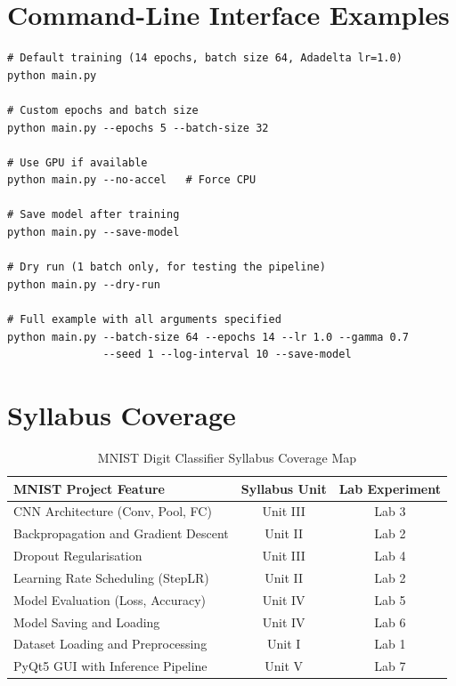 \documentclass[12pt,a4paper,openany]{report}
\begin{document}
\section{Command-Line Interface Examples}

\begin{verbatim}
# Default training (14 epochs, batch size 64, Adadelta lr=1.0)
python main.py

# Custom epochs and batch size
python main.py --epochs 5 --batch-size 32

# Use GPU if available
python main.py --no-accel   # Force CPU

# Save model after training
python main.py --save-model

# Dry run (1 batch only, for testing the pipeline)
python main.py --dry-run

# Full example with all arguments specified
python main.py --batch-size 64 --epochs 14 --lr 1.0 --gamma 0.7
               --seed 1 --log-interval 10 --save-model
\end{verbatim}

\section{Syllabus Coverage}

\begin{table}[H]
\centering
\begin{tabular}{|l|c|c|}
\hline
\textbf{MNIST Project Feature}        & \textbf{Syllabus Unit} & \textbf{Lab Experiment} \\
\hline
CNN Architecture (Conv, Pool, FC)     & Unit III               & Lab 3 \\
Backpropagation and Gradient Descent  & Unit II                & Lab 2 \\
Dropout Regularisation                & Unit III               & Lab 4 \\
Learning Rate Scheduling (StepLR)     & Unit II                & Lab 2 \\
Model Evaluation (Loss, Accuracy)     & Unit IV                & Lab 5 \\
Model Saving and Loading              & Unit IV                & Lab 6 \\
Dataset Loading and Preprocessing     & Unit I                 & Lab 1 \\
PyQt5 GUI with Inference Pipeline     & Unit V                 & Lab 7 \\
\hline
\end{tabular}
\caption{MNIST Digit Classifier Syllabus Coverage Map}
\end{table}
\end{document}
